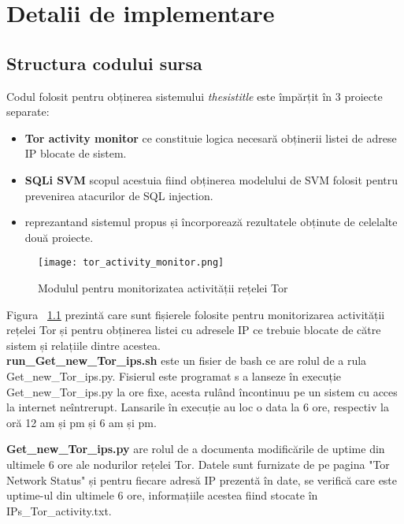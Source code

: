  \chapter{Detalii de implementare}
\label{cap:implementare}


\section{Structura codului sursa}

Codul folosit pentru obținerea sistemului \textit{thesistitle} este împărțit în 3 proiecte separate: 
\begin{itemize}
	\item \textbf {Tor activity monitor} ce constituie logica necesară obținerii listei de adrese IP blocate de sistem. 
	\item \textbf{SQLi SVM} scopul acestuia fiind obținerea modelului de SVM folosit pentru prevenirea atacurilor de SQL injection. 
	\item \textbf{\thesistitle} reprezantand sistemul propus și încorporează rezultatele obținute de celelalte două proiecte. 
\end{itemize}

\begin{figure}[h]
	\centering
	\texttt{[image: tor\_activity\_monitor.png]}
	\caption{Modulul pentru monitorizatea  activității rețelei Tor}
	\label{fig:tor_activity_monitor}
\end{figure}

Figura ~\ref{fig:tor_activity_monitor}  prezintă care sunt fișierele folosite pentru monitorizarea activității rețelei Tor și pentru obținerea listei cu adresele IP ce trebuie blocate de către sistem și relațiile dintre acestea. \\

\textbf{run\_Get\_new\_Tor\_ips.sh} este un fisier de bash ce are rolul de a rula Get\_new\_Tor\_ips.py. Fisierul este programat s a lanseze în execuție  Get\_new\_Tor\_ips.py  la ore fixe, acesta rulând încontinuu pe un sistem cu acces la internet neîntrerupt. Lansarile în execuție au loc o data la 6 ore, respectiv la oră 12 am și pm și 6 am și pm. 

\textbf{Get\_new\_Tor\_ips.py}  are rolul de a documenta modificările de uptime din ultimele 6 ore ale nodurilor rețelei Tor. Datele sunt furnizate de pe pagina "Tor Network Status" \cite{tot_status} și pentru fiecare adresă IP prezentă în date, se verifică care este uptime-ul din ultimele 6 ore, informațiile acestea fiind stocate în  IPs\_Tor\_activity.txt.

